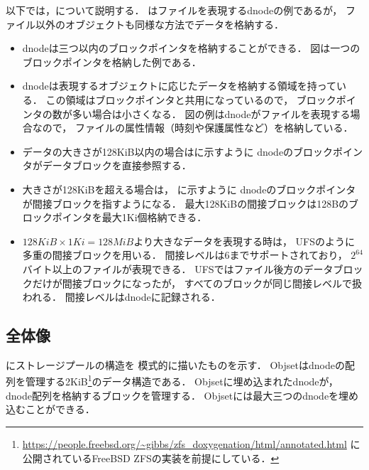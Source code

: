 以下では，について説明する．
はファイルを表現するdnodeの例であるが，
ファイル以外のオブジェクトも同様な方法でデータを格納する．

\begin{itemize}
\item dnodeは三つ以内のブロックポインタを格納することができる．
  図は一つのブロックポインタを格納した例である．
\item dnodeは表現するオブジェクトに応じたデータを格納する領域を持っている．
  この領域はブロックポインタと共用になっているので，
  ブロックポインタの数が多い場合は小さくなる．
  図の例はdnodeがファイルを表現する場合なので，
  ファイルの属性情報（時刻や保護属性など）を格納している．
\item データの大きさが128KiB以内の場合はに示すように
  dnodeのブロックポインタがデータブロックを直接参照する．
\item 大きさが128KiBを超える場合は，
  に示すように
  dnodeのブロックポインタが間接ブロックを指すようになる．
  最大128KiBの間接ブロックは128Bのブロックポインタを最大1Ki個格納できる．
\item $128KiB \times 1Ki = 128MiB$より大きなデータを表現する時は，
  UFSのように多重の間接ブロックを用いる．
  間接レベルは6までサポートされており，
  $2^{64}$バイト以上のファイルが表現できる．
  UFSではファイル後方のデータブロックだけが間接ブロックになったが，
  すべてのブロックが同じ間接レベルで扱われる．
  間接レベルはdnodeに記録される．
\end{itemize}

\subsection{全体像}
にストレージプールの構造を
模式的に描いたものを示す．
Objsetはdnodeの配列を管理する2KiB\footnote{
\url{https://people.freebsd.org/~gibbs/zfs_doxygenation/html/annotated.html}
に公開されているFreeBSD ZFSの実装を前提にしている．
}のデータ構造である．
Objsetに埋め込まれたdnodeが，dnode配列を格納するブロックを管理する．
Objsetには最大三つのdnodeを埋め込むことができる．

